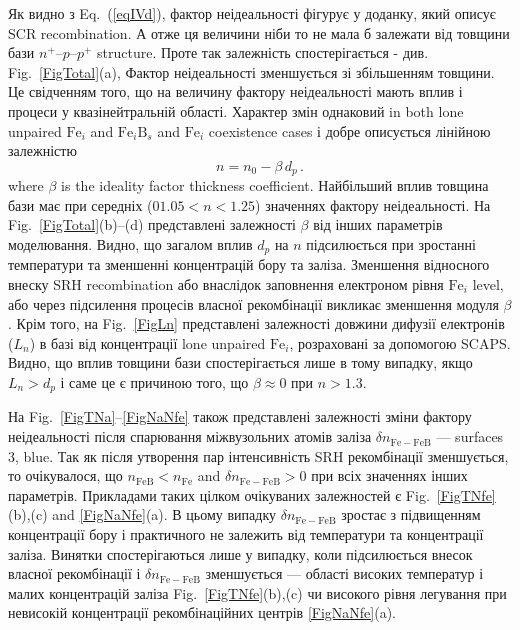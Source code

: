 \documentclass[12pt]{article}
\begin{document}
Як видно з Eq.~(\ref{eqIVd}), фактор неідеальності фігурує у доданку, який описує SCR recombination.
А отже ця величини ніби то не мала б залежати від товщини бази $n^+$--$p$--$p^+$ structure.
Проте так залежність спостерігається - див. Fig.~\ref{FigTotal}(a),
Фактор неідеальності зменшується зі збільшенням товщини.
Це  свідченням того, що на величину фактору неідеальності мають вплив і процеси у квазінейтральній області.
Характер змін однаковий in both lone unpaired $\mathrm{Fe}_i$ and $\mathrm{Fe}_i\mathrm{B}_s$ and $\mathrm{Fe}_i$ coexistence cases
і добре описується лінійною залежністю
\begin{equation}
\label{eqN_D}
    n=n_0-\beta\,d_p\,.
\end{equation}
where
$\beta$ is the ideality factor thickness coefficient.
Найбільший вплив товщина бази має при середніх ($01.05<n<1.25$) значеннях фактору неідеальності.
На Fig.~\ref{FigTotal}(b)--(d) представлені залежності $\beta$ від інших параметрів моделювання.
Видно, що загалом вплив $d_p$ на $n$ підсилюється при зростанні температури та зменшенні концентрацій бору та заліза.
Зменшення відносного внеску SRH recombination або внаслідок заповнення електроном рівня $\mathrm{Fe}_i$ level,
або через підсилення процесів власної рекомбінації викликає зменшення модуля $\beta$.
Крім того, на Fig.~\ref{FigLn} представлені залежності  довжини дифузії електронів ($L_n$) в базі від концентрації
lone unpaired $\mathrm{Fe}_i$, розраховані за допомогою SCAPS.
Видно, що вплив товщини бази спостерігається лише в тому випадку, якщо $L_n>d_p$ і саме це є причиною того, що $\beta\approx0$ при $n>1.3$.

На Fig.~\ref{FigTNa}--\ref{FigNaNfe} також представлені залежності зміни фактору неідеальності після спарювання
міжвузольних атомів заліза $\delta n_\mathrm{Fe-FeB}$ --- surfaces 3, blue.
Так як після утворення пар інтенсивність SRH рекомбінації зменшується, то очікувалося, що
$n_\mathrm{FeB}<n_\mathrm{Fe}$ and $\delta n_\mathrm{Fe-FeB}>0$ при всіх значеннях інших параметрів.
Прикладами таких цілком очікуваних залежностей є  Fig.~\ref{FigTNfe}(b),(c) and \ref{FigNaNfe}(a).
В цьому випадку $\delta n_\mathrm{Fe-FeB}$ зростає з підвищенням концентрації бору і практичного не залежить
від температури та концентрації заліза.
Винятки спостерігаються лише у випадку, коли підсилюється внесок власної рекомбінації і
$\delta n_\mathrm{Fe-FeB}$ зменшується --- області високих температур і малих концентрацій заліза Fig.~\ref{FigTNfe}(b),(c)
чи високого рівня легування при невисокій концентрації рекомбінаційних центрів \ref{FigNaNfe}(a).
\end{document}
